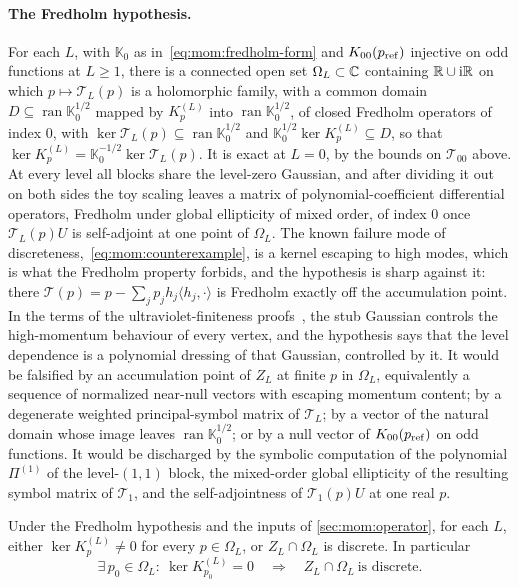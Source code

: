 \paragraph{The Fredholm hypothesis.}
For each $L$, with $\mathbb K_0$ as in~\eqref{eq:mom:fredholm-form} and $K_{00}(p_{\rm ref})$ injective on odd functions at $L \ge 1$, there is a connected open set $\Omega_L \subset \mathbb{C}$ containing $\mathbb{R} \cup \mathrm{i} \mathbb{R}$ on which $p \mapsto \mathcal T_L(p)$ is a holomorphic family, with a common domain $D \subseteq \operatorname{ran} \mathbb K_0^{1/2}$ mapped by $K^{(L)}_p$ into $\operatorname{ran} \mathbb K_0^{1/2}$, of closed Fredholm operators of index $0$, with $\ker \mathcal T_L(p) \subseteq \operatorname{ran} \mathbb K_0^{1/2}$ and $\mathbb K_0^{1/2} \ker K^{(L)}_p \subseteq D$, so that $\ker K^{(L)}_p = \mathbb K_0^{-1/2} \ker \mathcal T_L(p)$.
It is exact at $L = 0$, by the bounds on $\mathcal T_{00}$ above.
At every level all blocks share the level-zero Gaussian, and after dividing it out on both sides the toy scaling leaves a matrix of polynomial-coefficient differential operators, Fredholm under global ellipticity of mixed order, of index $0$ once $\mathcal T_L(p) U$ is self-adjoint at one point of $\Omega_L$.
The known failure mode of discreteness,~\eqref{eq:mom:counterexample}, is a kernel escaping to high modes, which is what the Fredholm property forbids, and the hypothesis is sharp against it: there $\mathcal T(p) = p - \sum_j p_j h_j \langle h_j, \cdot \rangle$ is Fredholm exactly off the accumulation point.
In the terms of the ultraviolet-finiteness proofs~\cite{deLacroix:2017:ClosedSuperstringField}, the stub Gaussian controls the high-momentum behaviour of every vertex, and the hypothesis says that the level dependence is a polynomial dressing of that Gaussian, controlled by it.
It would be falsified by an accumulation point of $Z_L$ at finite $p$ in $\Omega_L$, equivalently a sequence of normalized near-null vectors with escaping momentum content; by a degenerate weighted principal-symbol matrix of $\mathcal T_L$; by a vector of the natural domain whose image leaves $\operatorname{ran} \mathbb K_0^{1/2}$; or by a null vector of $K_{00}(p_{\rm ref})$ on odd functions.
It would be discharged by the symbolic computation of the polynomial $\Pi^{(1)}$ of the level-$(1, 1)$ block, the mixed-order global ellipticity of the resulting symbol matrix of $\mathcal T_1$, and the self-adjointness of $\mathcal T_1(p) U$ at one real $p$.

\begin{theorem}
  \label{thm:mom:dichotomy}
  Under the Fredholm hypothesis and the inputs of \cref{sec:mom:operator}, for each $L$, either $\ker K^{(L)}_p \ne 0$ for every $p \in \Omega_L$, or $Z_L \cap \Omega_L$ is discrete.
  In particular
  \begin{equation}
    \label{eq:mom:reference-point}
    \exists \, p_0 \in \Omega_L :\ \ker K^{(L)}_{p_0}
      = 0
    \quad \Longrightarrow \quad
    Z_L \cap \Omega_L \ \text{is discrete}.
  \end{equation}
\end{theorem}


